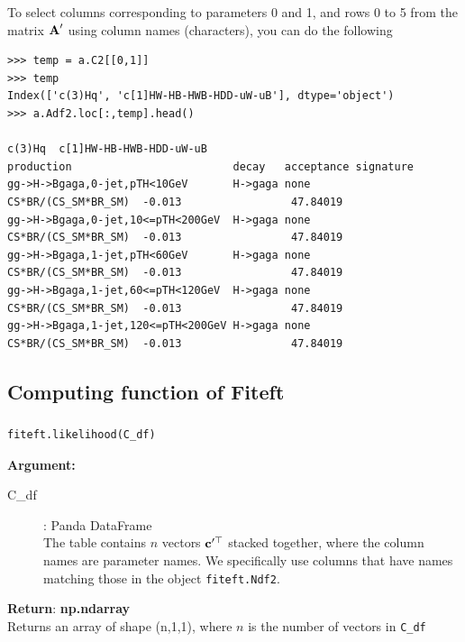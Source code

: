 \documentclass[12pt]{article}
\def\b#1{\boldsymbol{\rm #1}}
\begin{document}
To select columns corresponding to parameters 0 and 1, and rows 0 to 5 from the matrix $\b A'$ using column names (characters), you can do the following
\begin{verbatim}
>>> temp = a.C2[[0,1]]
>>> temp
Index(['c(3)Hq', 'c[1]HW-HB-HWB-HDD-uW-uB'], dtype='object')
>>> a.Adf2.loc[:,temp].head()
                                                                           c(3)Hq  c[1]HW-HB-HWB-HDD-uW-uB
production                         decay   acceptance signature                                           
gg->H->Bgaga,0-jet,pTH<10GeV       H->gaga none       CS*BR/(CS_SM*BR_SM)  -0.013                 47.84019
gg->H->Bgaga,0-jet,10<=pTH<200GeV  H->gaga none       CS*BR/(CS_SM*BR_SM)  -0.013                 47.84019
gg->H->Bgaga,1-jet,pTH<60GeV       H->gaga none       CS*BR/(CS_SM*BR_SM)  -0.013                 47.84019
gg->H->Bgaga,1-jet,60<=pTH<120GeV  H->gaga none       CS*BR/(CS_SM*BR_SM)  -0.013                 47.84019
gg->H->Bgaga,1-jet,120<=pTH<200GeV H->gaga none       CS*BR/(CS_SM*BR_SM)  -0.013                 47.84019
\end{verbatim}




\subsection{Computing function of Fiteft}

\subsubsection{}
\begin{verbatim}
fiteft.likelihood(C_df)
\end{verbatim}
\textbf{Argument:}
\begin{description}
  \item[C\_df]: Panda DataFrame\\
  The table contains $n$ vectors $\b c'^\top$ stacked together, where the column names are parameter names. We specifically use columns that have names matching those in the object \verb|fiteft.Ndf2|.
 \end{description}
 \textbf{Return}: \textbf{np.ndarray}\\
 \indent Returns an array of shape (n,1,1), where $n$ is the number of vectors in \verb|C_df|
\end{document}
